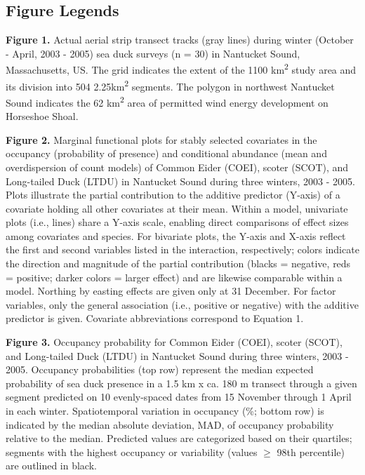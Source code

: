 \newpage
\subsection{Figure Legends}\label{figure-legends}

\textbf{Figure 1.} Actual aerial strip transect tracks (gray lines)
during winter (October - April, 2003 - 2005) sea duck surveys (n = 30)
in Nantucket Sound, Massachusetts, US. The grid indicates the extent of
the 1100 km\textsuperscript{2} study area and its division into 504
2.25km\textsuperscript{2} segments. The polygon in northwest Nantucket
Sound indicates the 62 km\textsuperscript{2} area of permitted wind
energy development on Horseshoe Shoal.

\textbf{Figure 2.} Marginal functional plots for stably selected
covariates in the occupancy (probability of presence) and conditional
abundance (mean and overdispersion of count models) of Common Eider
(COEI), scoter (SCOT), and Long-tailed Duck (LTDU) in Nantucket Sound
during three winters, 2003 - 2005. Plots illustrate the partial
contribution to the additive predictor (Y-axis) of a covariate holding
all other covariates at their mean. Within a model, univariate plots
(i.e., lines) share a Y-axis scale, enabling direct comparisons of
effect sizes among covariates and species. For bivariate plots, the
Y-axis and X-axis reflect the first and second variables listed in the
interaction, respectively; colors indicate the direction and magnitude
of the partial contribution (blacks = negative, reds = positive; darker
colors = larger effect) and are likewise comparable within a model.
Northing by easting effects are given only at 31 December. For factor
variables, only the general association (i.e., positive or negative)
with the additive predictor is given. Covariate abbreviations correspond
to Equation 1.

\textbf{Figure 3.} Occupancy probability for Common Eider (COEI), scoter
(SCOT), and Long-tailed Duck (LTDU) in Nantucket Sound during three
winters, 2003 - 2005. Occupancy probabilities (top row) represent the
median expected probability of sea duck presence in a 1.5 km x ca. 180 m
transect through a given segment predicted on 10 evenly-spaced dates
from 15 November through 1 April in each winter. Spatiotemporal
variation in occupancy (\%; bottom row) is indicated by the median
absolute deviation, MAD, of occupancy probability relative to the
median. Predicted values are categorized based on their quartiles;
segments with the highest occupancy or variability (values \(\geq\) 98th
percentile) are outlined in black.

